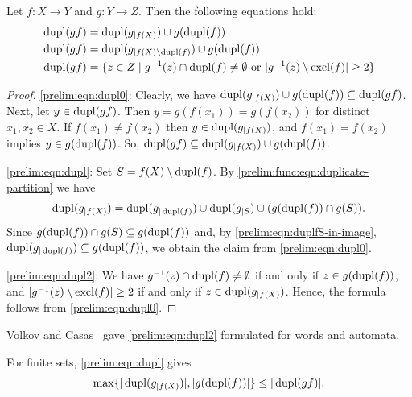 \begin{proposition} \label{prelim:prop:dupl}
  Let $f \colon X \to Y$ and $g \colon Y \to Z$.
  Then the following equations hold:
  \begin{align}
  	\dupl{\concat{f}{g}} & = \dupl{g_{|f(X)}} \cup g(\dupl{f}) \label{prelim:eqn:dupl0} \\
  	\dupl{\concat{f}{g}} & =	\dupl{g_{|f(X) \setminus \dupl{f}}}	\cup g(\dupl{f}) \label{prelim:eqn:dupl} \\
  	\dupl{\concat{f}{g}} & = \{ z \in Z \mid g^{-1}(z) \cap \dupl{f} \ne \emptyset \text{ or } | g^{-1}(z) \setminus \excl{f} | \ge 2 \} \label{prelim:eqn:dupl2}
  \end{align} 
\end{proposition}
\begin{proof}
\ref{prelim:eqn:dupl0}: Clearly, we have $\dupl{g_{|f(X)}} \cup g(\dupl{f}) \subseteq \dupl{\concat{f}{g}}$.
Next, let $y \in \dupl{\concat{f}{g}}$.
Then $y = g(f(x_1)) = g(f(x_2))$ for distinct $x_1, x_2 \in X$.
If $f(x_1) \ne f(x_2)$ then $y \in \dupl{g_{|f(X)}}$,
and $f(x_1) = f(x_2)$ implies $y \in g(\dupl{f})$.
So, $\dupl{\concat{f}{g}} \subseteq \dupl{g_{|f(X)}} \cup g(\dupl{f})$.

\ref{prelim:eqn:dupl}: Set $S = f(X) \setminus \dupl{f}$. 
By \cref{prelim:func:eqn:duplicate-partition} we have
\[
\dupl{g_{|f(X)}} = \dupl{g_{|\dupl{f}}} \cup \dupl{g_{|S}} \cup ( g(\dupl{f}) \cap g(S) ).
\]
Since $g(\dupl{f}) \cap g(S) \subseteq g(\dupl{f})$ and, by \cref{prelim:eqn:duplfS-in-image},
$\dupl{g_{|\dupl{f}}} \subseteq g(\dupl{f})$, we obtain the claim
from \cref{prelim:eqn:dupl0}.

\ref{prelim:eqn:dupl2}:  We have $g^{-1}(z) \cap \dupl{f} \ne \emptyset$
if and only if $z \in g(\dupl{f})$,
and $| g^{-1}(z) \setminus \excl{f} | \ge 2$
if and only if $z \in \dupl{g_{|f(X)}}$.
Hence, the formula follows from \cref{prelim:eqn:dupl0}.
\end{proof}

Volkov and Casas~\cite{DBLP:conf/latin/CasasV22} gave \cref{prelim:eqn:dupl2} 
formulated for words and automata.

For finite sets, \cref{prelim:eqn:dupl} gives
\begin{equation} \label{prelim:prop:item:duplcomp}
	\max\{ |\dupl{g_{|f(X)}}|, |g(\dupl{f})| \} \le |\dupl{\concat{f}{g}}|.
\end{equation}

